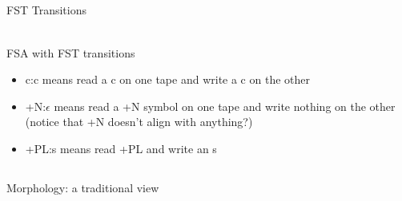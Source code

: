 \documentclass[9pt,xcolor=pdftex,dvipsnames,table]{beamer}
\begin{document}
\subsection{}
\begin{frame}{FST Transitions}
\begin{center}
	\\
	{\large FSA with FST transitions}\\
\end{center}
\vspace{.5cm}
\begin{itemize}
     \item c:c means read a c on one tape and write a c on the other
     \item +N:$\epsilon$ means read a +N symbol on one tape and write nothing on the other (notice that +N doesn't align with anything?)
     \item +PL:s means read +PL and write an s

\end{itemize}
\end{frame}

\subsection{}
\begin{frame}{Morphology: a traditional view}

\begin{center}
\end{center}
\end{frame}
\end{document}
